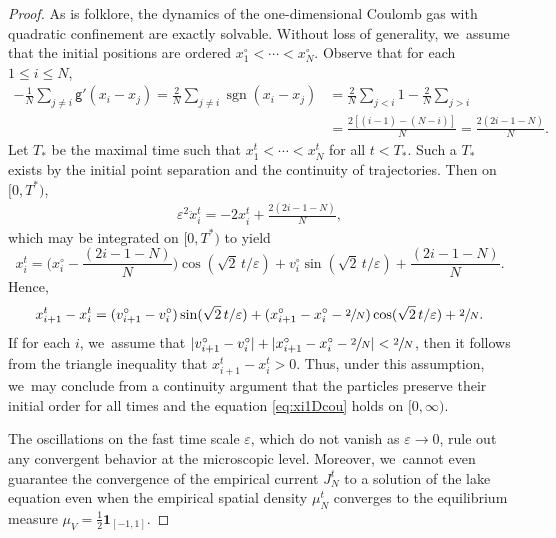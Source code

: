 \documentclass[10pt]{amsart}
\theoremstyle{plain}
\theoremstyle{definition}
\DeclareMathOperator{\sgn}{sgn}
\let\vep\varepsilon
\newcommand{\indic}{\mathbf{1}}
\newcommand{\g}{{\mathsf{g}}}
\begin{document}
\begin{proof}
As is folklore, the dynamics of the one-dimensional Coulomb gas with quadratic confinement are exactly solvable. Without loss of generality, we~assume that the initial positions are ordered $x_1^\circ<\cdots < x_N^\circ$. Observe that for each $1\le i\le N$,
\begin{align*}
- \frac1N\sum_{j\ne i}\g'(x_i-x_j) = \frac2N\sum_{j\neq i}\sgn(x_i-x_j) &= \frac2N\sum_{j<i} 1 - \frac2N\sum_{j>i}\\
&= \frac{2[(i-1) - (N-i)]}{N}= \frac{2(2i - 1-N)}{N}.
\end{align*}
Let $T_*$ be the maximal time such that $x_1^t<\cdots<x_N^t$ for all $t<T_*$. Such a $T_*$ exists by the initial point separation and the continuity of trajectories. Then on $[0,T^*)$,
\begin{align*}
\vep^2 \ddot{x}_i^t = - 2x_i^t + \frac{2(2i - 1-N)}{N},
\end{align*}
which may be integrated on $[0,T^*)$ to yield
\begin{equation}\label{eq:xi1Dcou}
x_i^t = \Big(x_i^\circ - \frac{(2i - 1-N)}{N}\Big)\cos(\sqrt{2}\,t/\vep) + v_i^\circ\sin(\sqrt{2}\,t/\vep) + \frac{(2i - 1-N)}{N}.
\end{equation}
Hence,
\begin{equation*}
x_{i+1}^t - x_i^t = (v_{i+1}^\circ - v_i^\circ)\sin(\sqrt{2}\,t/\vep) + (x_{i+1}^\circ-x_i^\circ - \sfrac{2}{N})\cos(\sqrt{2}\,t/\vep) + \sfrac{2}{N}.
\end{equation*}
If for each $i$, we~assume that $|v_{i+1}^\circ-v_i^\circ| + |x_{i+1}^\circ-x_i^\circ - \sfrac2N|< \sfrac2N$, then it follows from the triangle inequality that $x_{i+1}^t - x_i^t>0$. Thus, under this assumption, we~may conclude from a continuity argument that the particles preserve their initial order for all times and the equation \eqref{eq:xi1Dcou} holds on $[0,\infty)$.

The oscillations on the fast time scale $\vep$, which do not vanish as $\vep\to 0$, rule out any convergent behavior at the microscopic level. Moreover, we~cannot even guarantee the convergence of the empirical current $J_N^t$ to a solution of the lake equation even when the empirical spatial density $\mu_N^t$ converges to the equilibrium measure $\mu_V = \frac12\indic_{[-1,1]}$.


\end{proof}
\end{document}
